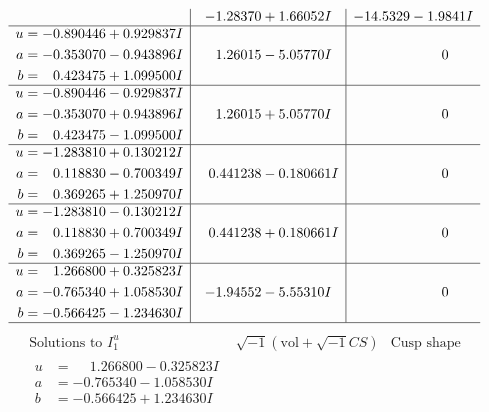 \documentclass[1p]{elsarticle_modified}
\theoremstyle{definition}
\newcommand{\I}{\sqrt{-1}}
\begin{document}
$$\begin{array}{c|c|c}
 & -1.28370 + 1.66052 I & -14.5329 - 1.9841 I \\ \hline\begin{aligned}
u &= -0.890446 + 0.929837 I \\
a &= -0.353070 - 0.943896 I \\
b &= \phantom{-}0.423475 + 1.099500 I\end{aligned}
 & \phantom{-}1.26015 - 5.05770 I & \phantom{-0.000000 } 0 \\ \hline\begin{aligned}
u &= -0.890446 - 0.929837 I \\
a &= -0.353070 + 0.943896 I \\
b &= \phantom{-}0.423475 - 1.099500 I\end{aligned}
 & \phantom{-}1.26015 + 5.05770 I & \phantom{-0.000000 } 0 \\ \hline\begin{aligned}
u &= -1.283810 + 0.130212 I \\
a &= \phantom{-}0.118830 - 0.700349 I \\
b &= \phantom{-}0.369265 + 1.250970 I\end{aligned}
 & \phantom{-}0.441238 - 0.180661 I & \phantom{-0.000000 } 0 \\ \hline\begin{aligned}
u &= -1.283810 - 0.130212 I \\
a &= \phantom{-}0.118830 + 0.700349 I \\
b &= \phantom{-}0.369265 - 1.250970 I\end{aligned}
 & \phantom{-}0.441238 + 0.180661 I & \phantom{-0.000000 } 0 \\ \hline\begin{aligned}
u &= \phantom{-}1.266800 + 0.325823 I \\
a &= -0.765340 + 1.058530 I \\
b &= -0.566425 - 1.234630 I\end{aligned}
 & -1.94552 - 5.55310 I & \phantom{-0.000000 } 0\\
 \hline 
 \end{array}$$\newpage$$\begin{array}{c|c|c}  
\text{Solutions to }I^u_{1}& \I (\text{vol} + \sqrt{-1}CS) & \text{Cusp shape}\\
 \hline 
\begin{aligned}
u &= \phantom{-}1.266800 - 0.325823 I \\
a &= -0.765340 - 1.058530 I \\
b &= -0.566425 + 1.234630 I\end{aligned}

\end{array}$$
\end{document}
